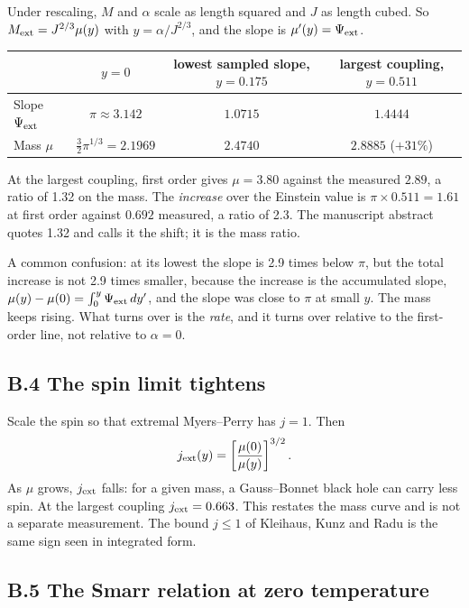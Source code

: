 \documentclass[12pt,a4paper]{article}
\begin{document}
Under rescaling, $M$ and $\alpha$ scale as length squared and $J$ as length cubed.
So $M_{\rm ext}=J^{2/3}\mu(y)$ with $y=\alpha/J^{2/3}$, and the slope is
$\mu'(y)=\Psi_{\rm ext}$.

\begin{center}\small
\begin{tabular}{@{}lccc@{}}
\hline
 & $y=0$ & lowest sampled slope, $y=0.175$ & largest coupling, $y=0.511$ \\ \hline
Slope $\Psi_{\rm ext}$ & $\pi\approx3.142$ & $1.0715$ & $1.4444$ \\
Mass $\mu$ & $\tfrac32\pi^{1/3}=2.1969$ & $2.4740$ & $2.8885$ ($+31\%$) \\ \hline
\end{tabular}
\end{center}

At the largest coupling, first order gives $\mu=3.80$ against the measured $2.89$, a
ratio of 1.32 on the mass. The \emph{increase} over the Einstein value is
$\pi\times0.511=1.61$ at first order against $0.692$ measured, a ratio of 2.3. The
manuscript abstract quotes 1.32 and calls it the shift; it is the mass ratio.

A common confusion: at its lowest the slope is 2.9 times below $\pi$, but the total
increase is not 2.9 times smaller, because the increase is the accumulated slope,
$\mu(y)-\mu(0)=\int_0^y\Psi_{\rm ext}\,dy'$, and the slope was close to $\pi$ at small
$y$. The mass keeps rising. What turns over is the \emph{rate}, and it turns over
relative to the first-order line, not relative to $\alpha=0$.

\subsection*{B.4 The spin limit tightens}

Scale the spin so that extremal Myers--Perry has $j=1$. Then
\[
j_{\rm ext}(y)=\left[\frac{\mu(0)}{\mu(y)}\right]^{3/2}.
\]
As $\mu$ grows, $j_{\rm ext}$ falls: for a given mass, a Gauss--Bonnet black hole can
carry less spin. At the largest coupling $j_{\rm ext}=0.663$. This restates the mass
curve and is not a separate measurement. The bound $j\le1$ of Kleihaus, Kunz and
Radu is the same sign seen in integrated form.

\subsection*{B.5 The Smarr relation at zero temperature}
\end{document}
